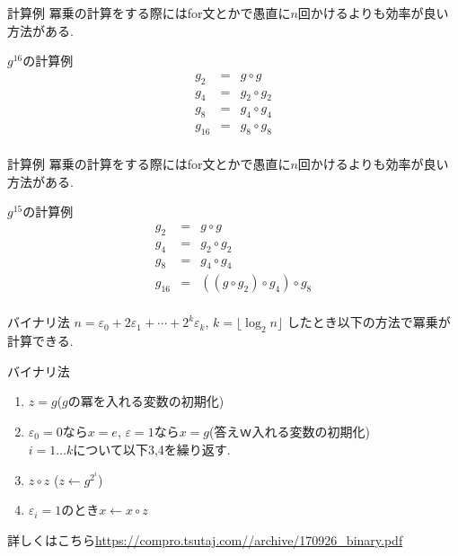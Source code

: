 \documentclass[dvipdfmx,11pt,notheorems]{beamer}
\begin{document}
\begin{frame}{計算例}
    冪乗の計算をする際にはfor文とかで愚直に$n$回かけるよりも効率が良い方法がある.
  \begin{exampleblock}{$g^{16}$の計算例}
    \begin{eqnarray*}
      g_2 &=& g\circ g\\
      g_4 &=& g_2 \circ g_2\\
      g_8 &=& g_4 \circ g_4\\
      g_{16} &=& g_8 \circ g_8\\
    \end{eqnarray*}
  \end{exampleblock}
\end{frame}
\begin{frame}{計算例}
    冪乗の計算をする際にはfor文とかで愚直に$n$回かけるよりも効率が良い方法がある.
    \begin{exampleblock}{$g^{15}$の計算例}
        \begin{eqnarray*}
          g_2 &=& g\circ g\\
          g_4 &=& g_2 \circ g_2\\
          g_8 &=& g_4 \circ g_4\\
          g_{16} &=& ((g \circ g_2) \circ g_4) \circ g_8\\
        \end{eqnarray*}
      \end{exampleblock}
\end{frame}
\begin{frame}{バイナリ法}
    $n = \varepsilon_0 + 2\varepsilon_1 + \cdots + 2^k\varepsilon_k$, $k = \lfloor \log_2 n \rfloor$
    したとき以下の方法で冪乗が計算できる.
  \begin{exampleblock}{バイナリ法}
    \begin{enumerate}
      \item $z = g$($g$の冪を入れる変数の初期化)
      \item $\varepsilon_0 = 0$なら$x = e$, $\varepsilon = 1$なら$x = g$(答えｗ入れる変数の初期化) \\
      $i=1\dots k$について以下3,4を繰り返す.
      \item $z \circ z$ ($z \leftarrow g^{2^i}$)
      \item $\varepsilon_i = 1$のとき$x \leftarrow x\circ z$
    \end{enumerate}
    詳しくはこちら\url{https://compro.tsutaj.com//archive/170926_binary.pdf}
  \end{exampleblock}
\end{frame}
\end{document}
